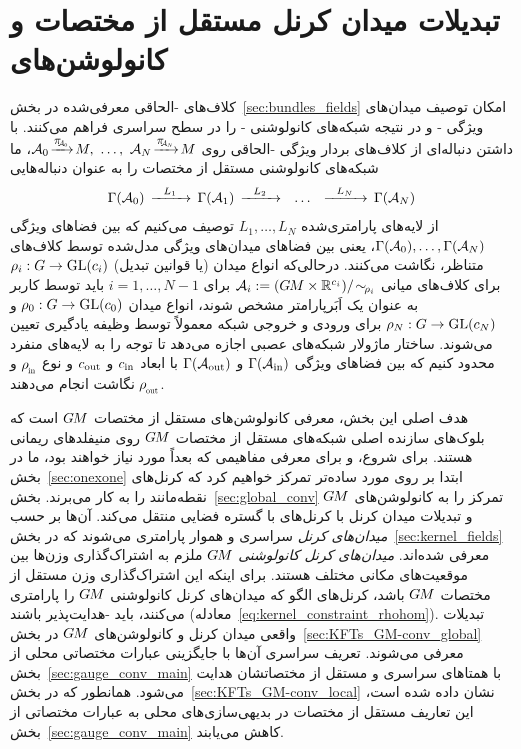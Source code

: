 

\section{تبدیلات میدان کرنل مستقل از مختصات و کانولوشن‌های }
\label{sec:gauge_CNNs_global}


کلاف‌های -الحاقی معرفی‌شده در بخش~\ref{sec:bundles_fields} امکان توصیف میدان‌های ویژگی - و در نتیجه شبکه‌های کانولوشنی - را در سطح سراسری فراهم می‌کنند.
با داشتن دنباله‌ای از کلاف‌های بردار ویژگی -الحاقی روی 
${\A_0\! \xrightarrow{\scalebox{.85}{$\pi_{{\scalebox{.65}{$\!\!\A_0$}}}$}}\! M ,}\ \dots,\ 
 {\A_N\! \xrightarrow{\scalebox{.85}{$\pi_{{\scalebox{.65}{$\!\!\A_N$}}}$}}\! M}$،
ما شبکه‌های کانولوشنی مستقل از مختصات را به عنوان دنباله‌هایی
\begin{align}
    \Gamma(\mathcal{A}_0)\, \xrightarrow{\ \ L_1\ \ }\, \Gamma(\mathcal{A}_1)\, \xrightarrow{\ \ L_2\ \ }\ \ \dots\ \ \xrightarrow{\ \ L_N\ \ }\, \Gamma(\mathcal{A}_N)
\end{align}
از لایه‌های پارامتری‌شده $L_1,\dots, L_N$ توصیف می‌کنیم که بین فضاهای ویژگی $\Gamma(\mathcal{A}_0), \dots, \Gamma(\mathcal{A}_N)$، یعنی بین فضاهای میدان‌های ویژگی مدل‌شده توسط کلاف‌های متناظر، نگاشت می‌کنند.
درحالی‌که انواع میدان (یا قوانین تبدیل) ${\rho_i:G\to\operatorname{GL}({c_i})}$ برای کلاف‌های میانی
$\mathcal{A}_i := (G\mkern-1.4muM\times\mathbb{R}^{c_i})/\!\sim_{\!\rho_i}$ برای $i=1,\dots,N-1$
باید توسط کاربر به عنوان یک اَبَرپارامتر مشخص شوند، انواع میدان $\rho_0:G\to\operatorname{GL}({c_0})$ و $\rho_N:G\to\operatorname{GL}({c_N})$ برای ورودی و خروجی شبکه معمولاً توسط وظیفه یادگیری تعیین می‌شوند.
ساختار ماژولار شبکه‌های عصبی اجازه می‌دهد تا توجه را به لایه‌های منفرد محدود کنیم که بین فضاهای ویژگی $\Gamma(\mathcal{A}_\textup{in})$ و $\Gamma(\mathcal{A}_\textup{out})$ با ابعاد ${c_\textup{in}}$ و ${c_\textup{out}}$ و نوع $\rhoin$ و $\rhoout$ نگاشت انجام می‌دهند.


\etocsettocstyle{}{} %
\localtableofcontents


هدف اصلی این بخش، معرفی کانولوشن‌های مستقل از مختصات $G\mkern-1.4muM$ است که بلوک‌های سازنده اصلی شبکه‌های مستقل از مختصات $G\mkern-1.4muM$ روی منیفلدهای ریمانی هستند.
برای شروع، و برای معرفی مفاهیمی که بعداً مورد نیاز خواهند بود، ما در بخش~\ref{sec:onexone} ابتدا بر روی مورد ساده‌تر \onexoneGMsit تمرکز خواهیم کرد که کرنل‌های نقطه‌مانند را به کار می‌برند.
بخش~\ref{sec:global_conv} تمرکز را به کانولوشن‌های $G\mkern-1.4muM$ و تبدیلات میدان کرنل با کرنل‌های با گستره فضایی منتقل می‌کند.
آن‌ها بر حسب \emph{میدان‌های کرنل} سراسری و هموار پارامتری می‌شوند که در بخش~\ref{sec:kernel_fields} معرفی شده‌اند.
\emph{میدان‌های کرنل کانولوشنی} $G\mkern-1.4muM$ ملزم به اشتراک‌گذاری وزن‌ها بین موقعیت‌های مکانی مختلف هستند.
برای اینکه این اشتراک‌گذاری وزن مستقل از مختصات $G\mkern-1.4muM$ باشد، کرنل‌های الگو که میدان‌های کرنل کانولوشنی $G\mkern-1.4muM$ را پارامتری می‌کنند، باید -هدایت‌پذیر باشند (معادله~\eqref{eq:kernel_constraint_rhohom}).
تبدیلات واقعی میدان کرنل و کانولوشن‌های $G\mkern-1.4muM$ در بخش~\ref{sec:KFTs_GM-conv_global} معرفی می‌شوند.
تعریف سراسری آن‌ها با جایگزینی عبارات مختصاتی محلی از بخش~\ref{sec:gauge_conv_main} با همتاهای سراسری و مستقل از مختصاتشان هدایت می‌شود.
همانطور که در بخش~\ref{sec:KFTs_GM-conv_local} نشان داده شده است، این تعاریف مستقل از مختصات در بدیهی‌سازی‌های محلی به عبارات مختصاتی از بخش~\ref{sec:gauge_conv_main} کاهش می‌یابند.